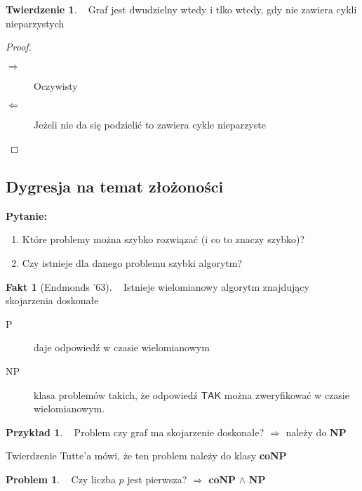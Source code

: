 \documentclass[a4paper,12pt]{article}
\theoremstyle{definition}%
\newtheorem{theorem}{Twierdzenie}%
\newtheorem*{fact*}{Fakt} %
\newtheorem{example}{Przykład}
\newtheorem*{example*}{Przykład} %
\theoremstyle{definition}
\theoremstyle{problem}
\newtheorem*{problem*}{Problem}
\begin{document}
\begin{theorem}~ %
Graf jest dwudzielny wtedy i tlko wtedy, gdy nie zawiera cykli nieparzystych
\end{theorem}
\begin{proof}~ %
\begin{description}
\item[$\Rightarrow$] Oczywisty
\item[$\Leftarrow$] Jeżeli nie da się podzielić to zawiera cykle nieparzyste
\end{description}
\end{proof}
\subsection{Dygresja na temat złożoności}
\textbf{Pytanie:}
\begin{enumerate}
\item Które problemy można szybko rozwiązać (i co to znaczy szybko)?
\item Czy istnieje dla danego problemu szybki algorytm?
\end{enumerate}
\begin{fact*}[Endmonds '63]~ %
Istnieje wielomianowy algorytm znajdujący skojarzenia doskonałe
\end{fact*}
\begin{description}
\item[P] daje odpowiedź w czasie wielomianowym
\item[NP] klasa problemów takich, że odpowiedź $\mathsf{TAK}$ można zweryfikować w czasie wielomianowym. 
\end{description}
\begin{example*}~ %
Problem czy graf ma skojarzenie doskonałe? $\Rightarrow$ należy do \textbf{NP}

Twierdzenie Tutte'a mówi, że ten problem należy do klasy \textbf{coNP}
\end{example*}
\begin{problem*}~ %
Czy liczba $p$ jest pierwsza? $\Rightarrow $ \textbf{coNP} $\land$ \textbf{NP}
\end{problem*}

\end{document}
